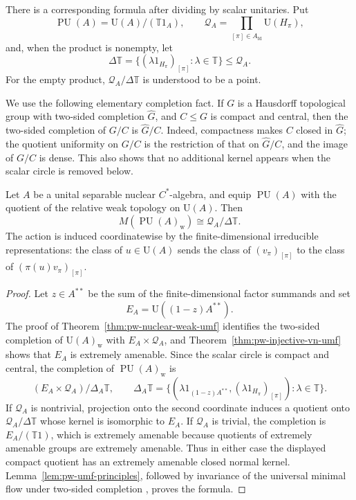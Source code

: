 There is a corresponding formula after dividing by scalar unitaries. Put
\[
 \operatorname{PU}(A)=\mathrm U(A)/(\mathbb T1_A),
 \qquad
 \mathcal Q_A=
 \prod_{[\pi]\in\widehat A_{\mathrm{fd}}}\mathrm U(H_\pi),
\]
and, when the product is nonempty, let
\[
 \Delta\mathbb T
 =\{(\lambda1_{H_\pi})_{[\pi]}:\lambda\in\mathbb T\}
 \leq\mathcal Q_A.
\]
For the empty product, \(\mathcal Q_A/\Delta\mathbb T\) is understood to be a
point.

We use the following elementary completion fact. If \(G\) is a Hausdorff
topological group with two-sided completion \(\widehat G\), and \(C\leq G\)
is compact and central, then the two-sided completion of \(G/C\) is
\(\widehat G/C\). Indeed, compactness makes \(C\) closed in \(\widehat G\);
the quotient uniformity on \(G/C\) is the restriction of that on
\(\widehat G/C\), and the image of \(G/C\) is dense. This also shows that no
additional kernel appears when the scalar circle is removed below.

\begin{theorem}\label{thm:pw-projective-nuclear-weak-umf}
Let \(A\) be a unital separable nuclear \(C^*\)-algebra, and equip
\(\operatorname{PU}(A)\) with the quotient of the relative weak topology on
\(\mathrm U(A)\). Then
\[
 M(\operatorname{PU}(A)_{\mathrm w})
 \cong \mathcal Q_A/\Delta\mathbb T.
\]
The action is induced coordinatewise by the finite-dimensional irreducible
representations: the class of \(u\in\mathrm U(A)\) sends the class of
\((v_\pi)_{[\pi]}\) to the class of
\((\pi(u)v_\pi)_{[\pi]}\).
\end{theorem}

\begin{proof}
Let \(z\in A^{**}\) be the sum of the finite-dimensional factor summands and
set
\[
 E_A=\mathrm U((1-z)A^{**}).
\]
The proof of Theorem~\ref{thm:pw-nuclear-weak-umf} identifies the two-sided
completion of \(\mathrm U(A)_{\mathrm w}\) with
\(E_A\times\mathcal Q_A\), and Theorem~\ref{thm:pw-injective-vn-umf} shows that
\(E_A\) is extremely amenable. Since the scalar circle is compact and central,
the completion of \(\operatorname{PU}(A)_{\mathrm w}\) is
\[
 (E_A\times\mathcal Q_A)/\Delta_A\mathbb T,
 \qquad
 \Delta_A\mathbb T
 =\{(\lambda1_{(1-z)A^{**}},
       (\lambda1_{H_\pi})_{[\pi]}):\lambda\in\mathbb T\}.
\]
If \(\mathcal Q_A\) is nontrivial, projection onto the second coordinate
induces a quotient onto \(\mathcal Q_A/\Delta\mathbb T\) whose kernel is
isomorphic to \(E_A\). If \(\mathcal Q_A\) is trivial, the completion is
\(E_A/(\mathbb T1)\), which is extremely amenable because quotients of
extremely amenable groups are extremely amenable. Thus in either case the
displayed compact quotient has an extremely amenable closed normal kernel.
Lemma~\ref{lem:pw-umf-principles}, followed by invariance of the universal minimal
flow under two-sided completion \cite[Fact~2.3]{BassoZucker2021}, proves the formula.
\end{proof}

